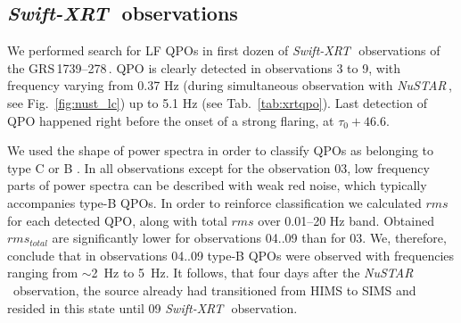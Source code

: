 \documentclass[a4paper,fleqn,usenatbib]{mnras}
\def\grs{{GRS\,1739--278\,}}
\def\swiftx{{\em Swift-XRT\,}}
\def\nustar{{\em NuSTAR\,}}
\begin{document}



\subsection{\swiftx\, observations}
We performed search for LF QPOs in first dozen of \swiftx\ observations of the \grs. 
QPO is clearly detected in observations 3 to 9, with frequency varying from 0.37 Hz (during simultaneous observation with \nustar, see Fig.~\ref{fig:nust_lc}) up to 5.1 Hz (see Tab.~\ref{tab:xrtqpo}). Last detection of QPO happened right before the onset of a strong flaring, at $\tau_{0}+46.6$. 

We used the shape of power spectra in order to classify QPOs as belonging to type C or B \citep{casella05}. 
In all observations except for the observation 03, low frequency parts of power spectra can be described with weak red noise, which typically accompanies type-B QPOs.
In order to reinforce classification we calculated $rms$ for each detected QPO, along with total $rms$ over 0.01--20 Hz band. 
Obtained $rms_{total}$ are significantly lower for observations 04..09 than for 03. 
We, therefore, conclude that in observations 04..09 type-B QPOs were observed with frequencies ranging from $\sim$2~Hz to 5~Hz.
It follows, that four days after the \nustar\ observation, the source already had transitioned from HIMS to SIMS and resided in this state until 09 \swiftx\ observation. 
\end{document}
